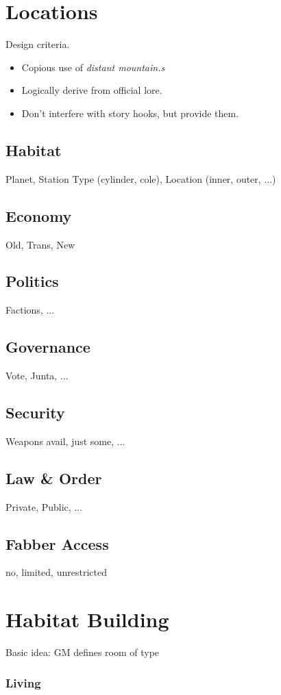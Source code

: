 \documentclass[a4]{article}
\begin{document}
\section{Locations}

Design criteria.

\begin{itemize}
    \item Copious use of \textit{distant mountain.s}
    \item Logically derive from official \eclipsephase lore.
    \item Don't interfere with story hooks, but provide them.
\end{itemize}

\subsection{Habitat} Planet, Station Type (cylinder, cole), Location (inner, outer, ...)
\subsection{Economy} Old, Trans, New
\subsection{Politics} Factions, ...
\subsection{Governance} Vote, Junta, ...
\subsection{Security} Weapons avail, just some, ...
\subsection{Law \& Order} Private, Public, ...
\subsection{Fabber Access} no, limited, unrestricted


\section{Habitat Building}

Basic idea: GM defines room of type


\subsubsection{Living}
\end{document}
